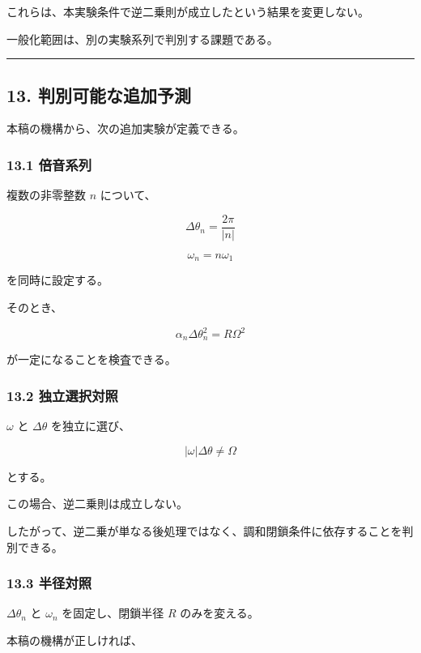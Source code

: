 \documentclass[
  10pt,
  a4paper,
]{ltjsarticle}
\begin{document}
これらは、本実験条件で逆二乗則が成立したという結果を変更しない。

一般化範囲は、別の実験系列で判別する課題である。

\begin{center}\rule{0.5\linewidth}{0.5pt}\end{center}

\subsection{13.
判別可能な追加予測}\label{ux5224ux5225ux53efux80fdux306aux8ffdux52a0ux4e88ux6e2c}

本稿の機構から、次の追加実験が定義できる。

\subsubsection{13.1 倍音系列}\label{ux500dux97f3ux7cfbux5217}

複数の非零整数 \(n\) について、

\[
\Delta\theta_n=\frac{2\pi}{|n|}
\]

\[
\omega_n=n\omega_1
\]

を同時に設定する。

そのとき、

\[
\alpha_n\Delta\theta_n^2
=R\Omega^2
\]

が一定になることを検査できる。

\subsubsection{13.2
独立選択対照}\label{ux72ecux7acbux9078ux629eux5bfeux7167}

\(\omega\) と \(\Delta\theta\) を独立に選び、

\[
|\omega|\Delta\theta\neq\Omega
\]

とする。

この場合、逆二乗則は成立しない。

したがって、逆二乗が単なる後処理ではなく、調和閉鎖条件に依存することを判別できる。

\subsubsection{13.3 半径対照}\label{ux534aux5f84ux5bfeux7167}

\(\Delta\theta_n\) と \(\omega_n\) を固定し、閉鎖半径 \(R\)
のみを変える。

本稿の機構が正しければ、
\end{document}
